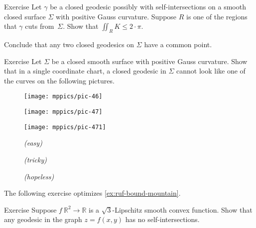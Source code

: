 \begin{thm}{Exercise}\label{ex:closed-geodesic}
Let $\gamma$ be a closed geodesic possibly with self-intersections on a smooth closed surface $\Sigma$ with positive Gauss curvature.
Suppose $R$ is one of the regions that $\gamma$ cuts from~$\Sigma$.
Show that $\iint_R K\le 2\cdot\pi$.

Conclude that any two closed geodesics on $\Sigma$ have a common point.
\end{thm}

\begin{thm}{Exercise}\label{ex:self-intersections}
Let $\Sigma$ be a closed smooth surface with positive Gauss curvature. 
Show that in a single coordinate chart, a closed geodesic in $\Sigma$ cannot look like one of the curves on the following pictures.

\begin{figure}[h]
\begin{minipage}{.32\textwidth}
\centering
\texttt{[image: mppics/pic-46]}
\end{minipage}
\hfill
\begin{minipage}{.32\textwidth}
\centering
\texttt{[image: mppics/pic-47]}
\end{minipage}
\hfill
\begin{minipage}{.32\textwidth}
\centering
\texttt{[image: mppics/pic-471]}
\end{minipage}

\medskip

\begin{minipage}{.32\textwidth}
\centering
\caption*{\textit{(easy)}}
\end{minipage}
\hfill
\begin{minipage}{.32\textwidth}
\centering
\caption*{\textit{(tricky)}}
\end{minipage}
\hfill
\begin{minipage}{.32\textwidth}
\centering
\caption*{\textit{(hopeless)}}
\end{minipage}
\vskip-5mm
\end{figure}

\end{thm}


The following exercise optimizes \ref{ex:ruf-bound-mountain}.

\begin{thm}{Exercise}\label{ex:sqrt(3)}
Suppose $f\:\mathbb{R}^2\to\mathbb{R}$ is a $\sqrt{3}$-Lipschitz smooth convex function.
Show that any geodesic in the graph $z=f(x,y)$ has no self-intersections.
\end{thm}


